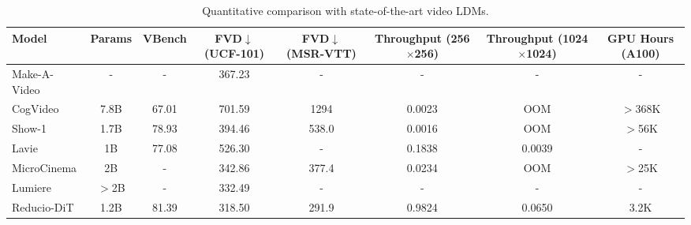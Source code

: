     
    
    \begin{table}[H]
    \centering
    \caption{Quantitative comparison with state-of-the-art video LDMs.}
    \label{tab:video_ldms_comparison}
    \begin{tabular}{lccccccc}
    \toprule
    Model & Params & VBench & FVD$\downarrow$ (UCF-101) & FVD$\downarrow$ (MSR-VTT) & Throughput (256$\times$256) & Throughput (1024$\times$1024) & GPU Hours (A100) \\
    \midrule
    Make-A-Video \cite{makeavideo} & - & - & 367.23 & - & - & - & - \\
    CogVideo \cite{cogvideo} & 7.8B & 67.01 & 701.59 & 1294 & 0.0023 & OOM & $>$368K \\
    Show-1 \cite{show1} & 1.7B & 78.93 & 394.46 & 538.0 & 0.0016 & OOM & $>$56K \\
    Lavie \cite{lavie} & 1B & 77.08 & 526.30 & - & 0.1838 & 0.0039 & - \\
    MicroCinema \cite{microcinema} & 2B & - & 342.86 & 377.4 & 0.0234 & OOM & $>$25K \\
    Lumiere \cite{lumiere} & $>$2B & - & 332.49 & - & - & - & - \\
    \midrule
    Reducio-DiT & 1.2B & 81.39 & 318.50 & 291.9 & 0.9824 & 0.0650 & 3.2K \\
    \bottomrule
    \end{tabular}
    \end{table}